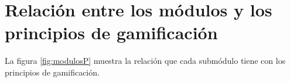 
\section{Relación entre los módulos y los principios de gamificación}
\label{analisis:principios}
    
    La figura \ref{fig:modulosP} muestra la relación que cada submódulo tiene con los principios de gamificación.
    
